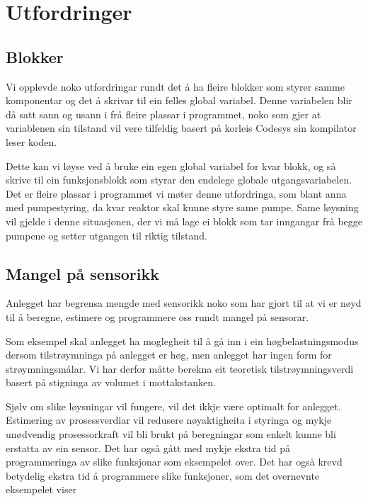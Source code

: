 \section{Utfordringer}
\thispagestyle{fancy}

\subsection{Blokker}
Vi opplevde noko utfordringar rundt det å ha fleire blokker som styrer samme komponentar og det å  
skrivar til ein felles global variabel.
Denne variabelen blir då satt sann og usann i frå fleire plassar i programmet, noko som gjer at 
variablenen sin tilstand vil vere tilfeldig basert på korleis Codesys sin kompilator leser koden.

Dette kan vi løyse ved å bruke ein egen global variabel for kvar blokk, 
og så skrive til ein funksjonsblokk som styrar den endelege globale utgangsvariabelen.
Det er fleire plassar i programmet vi møter denne utfordringa, som blant anna med pumpestyring, 
da kvar reaktor skal kunne styre same pumpe. Same løysning vil gjelde i denne situasjonen, 
der vi må lage ei blokk som tar inngangar frå begge pumpene og setter utgangen til riktig tilstand.  

\subsection{Mangel på sensorikk}

Anlegget har begrensa mengde med sensorikk noko som har gjort til at vi er nøyd til å
beregne, estimere og programmere oss rundt mangel på sensorar.

Som eksempel skal anlegget ha moglegheit til å gå inn i ein
høgbelastningsmodus dersom tilstrøymninga på anlegget er høg, 
men anlegget har ingen form for strøymningsmålar.\newline
Vi har derfor måtte berekna eit teoretisk tilstrøymningsverdi basert på stigninga
av volumet i mottakstanken.

Sjølv om slike løysningar vil fungere, vil det ikkje være optimalt for anlegget.
Estimering av prosessverdiar vil redusere nøyaktigheita i styringa og
mykje unødvendig prosessorkraft vil bli brukt på beregningar som enkelt kunne bli
erstatta av ein sensor. Det har også gått med mykje ekstra tid på programmeringa 
av slike funksjonar som eksempelet over.
Det har også krevd betydelig ekstra tid å programmere slike funksjoner, 
som det overnevnte eksempelet viser




